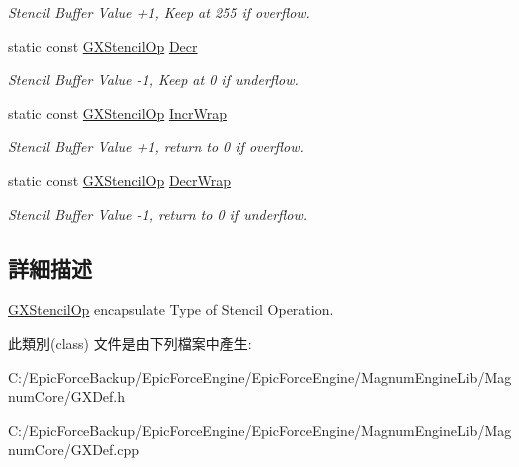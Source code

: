 \begin{DoxyCompactItemize}
\begin{DoxyCompactList}\small\item\em Stencil Buffer Value +1, Keep at 255 if overflow. \end{DoxyCompactList}\item 
static const \hyperlink{class_magnum_1_1_g_x_stencil_op}{G\+X\+Stencil\+Op} \hyperlink{class_magnum_1_1_g_x_stencil_op_af1b6ebd91e1ab4a5fcbc50bbcbeb88f1}{Decr}\hypertarget{class_magnum_1_1_g_x_stencil_op_af1b6ebd91e1ab4a5fcbc50bbcbeb88f1}{}\label{class_magnum_1_1_g_x_stencil_op_af1b6ebd91e1ab4a5fcbc50bbcbeb88f1}

\begin{DoxyCompactList}\small\item\em Stencil Buffer Value -\/1, Keep at 0 if underflow. \end{DoxyCompactList}\item 
static const \hyperlink{class_magnum_1_1_g_x_stencil_op}{G\+X\+Stencil\+Op} \hyperlink{class_magnum_1_1_g_x_stencil_op_ac60189db59d90cbd80df0bcc4f96c98f}{Incr\+Wrap}\hypertarget{class_magnum_1_1_g_x_stencil_op_ac60189db59d90cbd80df0bcc4f96c98f}{}\label{class_magnum_1_1_g_x_stencil_op_ac60189db59d90cbd80df0bcc4f96c98f}

\begin{DoxyCompactList}\small\item\em Stencil Buffer Value +1, return to 0 if overflow. \end{DoxyCompactList}\item 
static const \hyperlink{class_magnum_1_1_g_x_stencil_op}{G\+X\+Stencil\+Op} \hyperlink{class_magnum_1_1_g_x_stencil_op_ab619338ad52e50bfcdd5c5e7c3c93dba}{Decr\+Wrap}\hypertarget{class_magnum_1_1_g_x_stencil_op_ab619338ad52e50bfcdd5c5e7c3c93dba}{}\label{class_magnum_1_1_g_x_stencil_op_ab619338ad52e50bfcdd5c5e7c3c93dba}

\begin{DoxyCompactList}\small\item\em Stencil Buffer Value -\/1, return to 0 if underflow. \end{DoxyCompactList}\end{DoxyCompactItemize}


\subsection{詳細描述}
\hyperlink{class_magnum_1_1_g_x_stencil_op}{G\+X\+Stencil\+Op} encapsulate Type of Stencil Operation. 

此類別(class) 文件是由下列檔案中產生\+:\begin{DoxyCompactItemize}
\item 
C\+:/\+Epic\+Force\+Backup/\+Epic\+Force\+Engine/\+Epic\+Force\+Engine/\+Magnum\+Engine\+Lib/\+Magnum\+Core/G\+X\+Def.\+h\item 
C\+:/\+Epic\+Force\+Backup/\+Epic\+Force\+Engine/\+Epic\+Force\+Engine/\+Magnum\+Engine\+Lib/\+Magnum\+Core/G\+X\+Def.\+cpp\end{DoxyCompactItemize}
